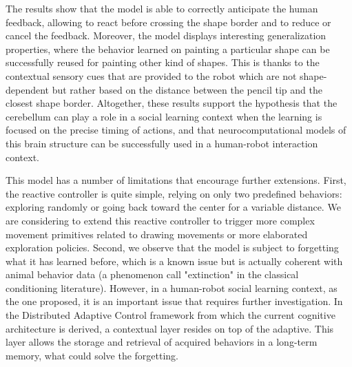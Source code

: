 \documentclass[letterpaper, 10 pt, conference]{ieeeconf}  %
\begin{document}
The results show that the model is able to correctly anticipate the human feedback, allowing to react before crossing the shape border and to reduce or cancel the feedback. Moreover, the model displays interesting generalization properties, where the behavior learned on painting a particular shape can be successfully reused for painting other kind of shapes. This is thanks to the contextual sensory cues that are provided to the robot which are not shape-dependent but rather based on the distance between the pencil tip and the closest shape border. Altogether, these results support the hypothesis that the cerebellum can play a role in a social learning context when the learning is focused on the precise timing of actions, and that neurocomputational models of this brain structure can be successfully used in a human-robot interaction context.

This model has a number of limitations that encourage further extensions. First, the reactive controller is quite simple, relying on only two predefined behaviors: exploring randomly or going back toward the center for a variable distance. We are considering to extend this reactive controller to trigger more complex movement primitives related to drawing movements or more elaborated exploration policies. Second, we observe that the model is subject to forgetting what it has learned before, which is a known issue but is actually coherent with animal behavior data (a phenomenon call "extinction" in the classical conditioning literature). However, in a human-robot social learning context, as the one proposed, it is an important issue that requires further investigation. In the Distributed Adaptive Control framework from which the current cognitive architecture is derived, a contextual layer resides on top of the adaptive. This layer allows the storage and retrieval of acquired behaviors in a long-term memory, what could solve the forgetting.
\end{document}
